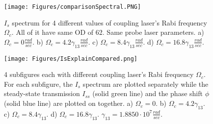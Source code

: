 \begin{figure}
    \centering
    \texttt{[image: Figures/comparisonSpectral.PNG]}
    \caption{$I_{s}$ spectrum for 4 different values of coupling laser's Rabi frequency $\Omega_{c}$. All of it have same OD of 62. Same probe laser parameters. a) $\Omega_{c} = 0 \frac{rad}{sec}$. b) $\Omega_{c} = 4.2\gamma_{13} \frac{rad}{sec}$. c) $\Omega_{c} = 8.4\gamma_{13} \frac{rad}{sec}$. d) $\Omega_{c} = 16.8\gamma_{13} \frac{rad}{sec}$.}
    \label{fig: compare Is spectrums}
\end{figure}

\begin{figure}[h!]
    \centering
    \texttt{[image: Figures/IsExplainCompared.png]}
    \caption{4 subfigures each with different coupling laser's Rabi frequency $\Omega_{c}$. For each subfigure, the $I_{s}$ spectrum are plotted separately while the steady-state transmission $I_{ss}$ (solid green line) and the phase shift $\phi$ (solid blue line) are plotted on together. a) $\Omega_{c} = 0$. b) $\Omega_{c} = 4.2\gamma_{13}$. c) $\Omega_{c} = 8.4\gamma_{13}$. d) $\Omega_{c} = 16.8\gamma_{13}$. $\gamma_{13} = 1.8850 \cdot 10^{7} \frac{rad}{sec}$.}
    \label{fig: Is compared to transmission & phase shift}
\end{figure}

